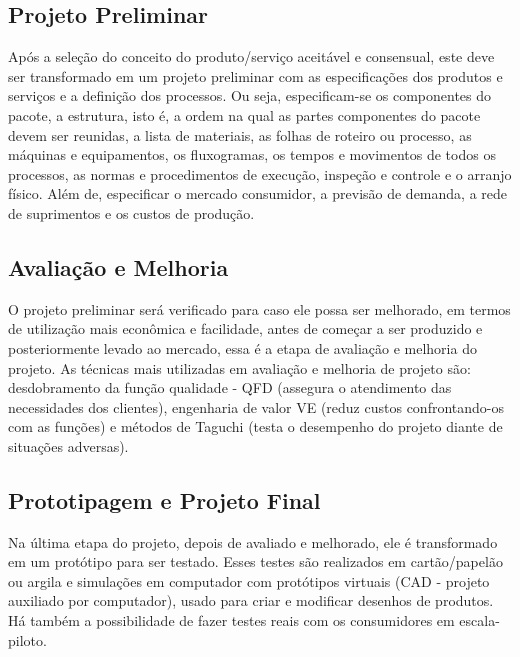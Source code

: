 		\subsection[Projeto Preliminar]{Projeto Preliminar}
		\label{sec:produtos_etapas_preliminar}

			Após a seleção do conceito do produto/serviço aceitável e consensual, este deve ser transformado em um projeto preliminar com as especificações dos produtos e serviços e a definição dos processos. Ou seja, especificam-se os componentes do pacote, a estrutura, isto é, a ordem na qual as partes componentes do pacote devem ser reunidas, a lista de materiais, as folhas de roteiro ou processo, as máquinas e equipamentos, os fluxogramas, os tempos e movimentos de todos os processos, as normas e procedimentos de execução, inspeção e controle e o arranjo físico. Além de, especificar o mercado consumidor, a previsão de demanda, a rede de suprimentos e os custos de produção. 

		\subsection[Avaliação e Melhoria]{Avaliação e Melhoria}
		\label{sec:produtos_etapas_avaliacaoMelhoria}

			O projeto preliminar será verificado para caso ele possa ser melhorado, em termos de utilização mais econômica e facilidade, antes de começar a ser produzido e posteriormente levado ao mercado, essa é a etapa de avaliação e melhoria do projeto. As técnicas mais utilizadas em avaliação e melhoria de projeto são: desdobramento da função qualidade - QFD (assegura o atendimento das necessidades dos clientes), engenharia de valor VE (reduz custos confrontando-os com as funções) e métodos de Taguchi (testa o desempenho do projeto diante de situações adversas).

		\subsection[Prototipagem e Projeto Final]{Prototipagem e Projeto Final}
		\label{sec:produtos_etapas_projetoFinal}

			Na última etapa do projeto, depois de avaliado e melhorado, ele é transformado em um protótipo para ser testado. Esses testes são realizados em cartão/papelão ou argila e simulações em computador com protótipos virtuais (CAD - projeto auxiliado por computador), usado para criar e modificar desenhos de produtos. Há também a possibilidade de fazer testes reais com os consumidores em escala-piloto. 
            
